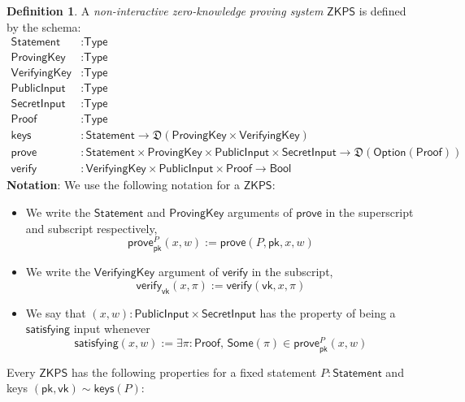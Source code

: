 \documentclass[a4paper]{article}
\theoremstyle{definition}
\newtheorem{definition}{Definition}[subsection]
\newcommand{\Bool}{{\textsf{Bool}}}
\newcommand{\Option}{{\textsf{Option}}}
\newcommand{\Proof}{{\textsf{Proof}}}
\newcommand{\ProvingKey}{{\textsf{ProvingKey}}}
\newcommand{\PublicInput}{{\textsf{PublicInput}}}
\newcommand{\SecretInput}{{\textsf{SecretInput}}}
\newcommand{\Some}{{\textsf{Some}}}
\newcommand{\Statement}{{\textsf{Statement}}}
\newcommand{\Type}{{\textsf{Type}}}
\newcommand{\VerifyingKey}{{\textsf{VerifyingKey}}}
\newcommand{\ZKPS}{{\textsf{ZKPS}}}
\newcommand{\keys}{{\textsf{keys}}}
\newcommand{\pk}{{\textsf{pk}}}
\newcommand{\prove}{{\textsf{prove}}}
\newcommand{\satisfying}{{\textsf{satisfying}}}
\newcommand{\verify}{{\textsf{verify}}}
\newcommand{\vk}{{\textsf{vk}}}
\begin{document}
\begin{definition}
    A \emph{non-interactive zero-knowledge proving system} $\ZKPS$ is defined by the schema:
    \begin{align*}
        \Statement    &: \Type \\
        \ProvingKey   &: \Type \\
        \VerifyingKey &: \Type \\
        \PublicInput  &: \Type \\
        \SecretInput  &: \Type \\
        \Proof        &: \Type \\
        \keys         &: \Statement \to \mathfrak{D}(\ProvingKey \times \VerifyingKey) \\
        \prove        &: \Statement \times \ProvingKey \times \PublicInput \times \SecretInput \to \mathfrak{D}(\Option(\Proof)) \\
        \verify       &: \VerifyingKey \times \PublicInput \times \Proof \to \Bool
    \end{align*}
    \textbf{Notation}: We use the following notation for a $\ZKPS$:
    \begin{itemize}
        \item We write the $\Statement$ and $\ProvingKey$ arguments of $\prove$ in the superscript and subscript respectively,
            \[\prove^P_\pk(x, w) := \prove(P, \pk, x, w)\]
        \item We write the $\VerifyingKey$ argument of $\verify$ in the subscript,
            \[\verify_\vk(x, \pi) := \verify(\vk, x, \pi)\]
        \item We say that $(x, w) : \PublicInput \times \SecretInput$ has the property of being a $\satisfying$ input whenever
            \[\satisfying(x, w) := \exists \pi : \Proof,\, \Some(\pi) \in \prove^P_\pk(x, w)\]
    \end{itemize}

    Every $\ZKPS$ has the following properties for a fixed statement $P : \Statement$ and keys $(\pk, \vk) \sim \keys(P)$:


\end{definition}
\end{document}
